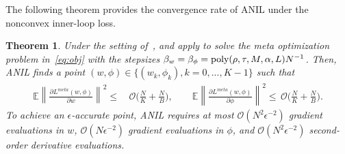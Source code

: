 \documentclass{osudissert96}
\newtheorem{theorem}{Theorem}
\begin{document}
 The following theorem provides the convergence rate of ANIL under the nonconvex inner-loop loss.%
\begin{theorem}\label{th:nonconvexcaonidaxeas} %
Under the setting of~, and apply  to solve the meta optimization problem in~\cref{eq:obj} with the stepsizes {\small $\beta_w = \beta_\phi=\text{\normalfont poly}(\rho,\tau,M,\alpha,L) N^{-1}$}. %
Then, ANIL  finds a point $(w,\phi)\in\{(w_k,\phi_k),k=0,...,K-1\}$ such that 
\begin{align*}
\mathbb{E}\left\| \frac{\partial L^{meta}(w,\phi)}{\partial w}\right\|^2  \leq& \,\mathcal{O}\bigg(  \frac{N}{K} + \frac{N}{B}  \bigg), \qquad
\mathbb{E}\left\| \frac{\partial L^{meta}(w,\phi)}{\partial \phi}\right\|^2  \leq \,\mathcal{O}\bigg(  \frac{N}{K} + \frac{N}{B}  \bigg).
\end{align*}
To achieve an $\epsilon$-accurate point, ANIL requires at most {\small $\mathcal{O}(N^2\epsilon^{-2})$} gradient evaluations in $w$, {\small $\mathcal{O}(N\epsilon^{-2})$} gradient evaluations in $\phi$,  and {\small $\mathcal{O}(N^2\epsilon^{-2})$} second-order derivative evaluations.%
\end{theorem}
\end{document}
